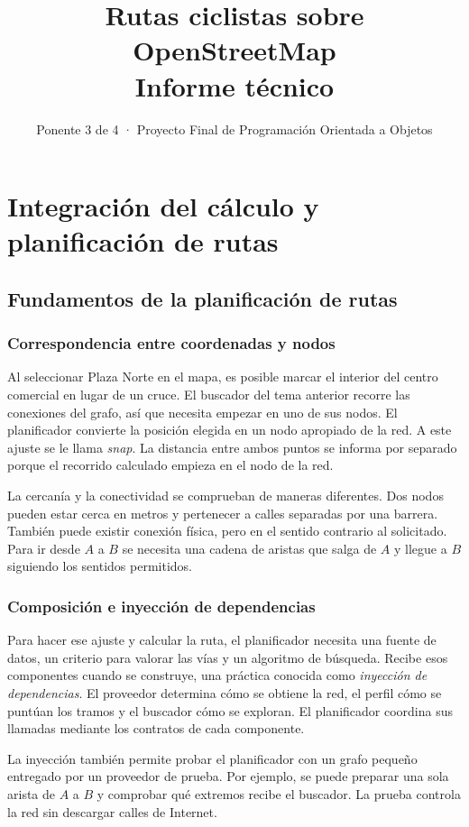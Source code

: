 \documentclass[11pt,a4paper]{article}
\title{Rutas ciclistas sobre OpenStreetMap\\Informe técnico}
\author{Ponente 3 de 4 · Proyecto Final de Programación Orientada a Objetos}
\date{}
\begin{document}
\maketitle
\setcounter{section}{2}
\section{Integración del cálculo y planificación de rutas}

\subsection{Fundamentos de la planificación de rutas}

\subsubsection{Correspondencia entre coordenadas y nodos}
Al seleccionar Plaza Norte en el mapa, es posible marcar el interior del centro comercial en lugar de un cruce. El buscador del tema anterior recorre las conexiones del grafo, así que necesita empezar en uno de sus nodos. El planificador convierte la posición elegida en un nodo apropiado de la red. A este ajuste se le llama \emph{snap}. La distancia entre ambos puntos se informa por separado porque el recorrido calculado empieza en el nodo de la red.

La cercanía y la conectividad se comprueban de maneras diferentes. Dos nodos pueden estar cerca en metros y pertenecer a calles separadas por una barrera. También puede existir conexión física, pero en el sentido contrario al solicitado. Para ir desde \(A\) a \(B\) se necesita una cadena de aristas que salga de \(A\) y llegue a \(B\) siguiendo los sentidos permitidos.

\subsubsection{Composición e inyección de dependencias}
Para hacer ese ajuste y calcular la ruta, el planificador necesita una fuente de datos, un criterio para valorar las vías y un algoritmo de búsqueda. Recibe esos componentes cuando se construye, una práctica conocida como \emph{inyección de dependencias}. El proveedor determina cómo se obtiene la red, el perfil cómo se puntúan los tramos y el buscador cómo se exploran. El planificador coordina sus llamadas mediante los contratos de cada componente.

La inyección también permite probar el planificador con un grafo pequeño entregado por un proveedor de prueba. Por ejemplo, se puede preparar una sola arista de \(A\) a \(B\) y comprobar qué extremos recibe el buscador. La prueba controla la red sin descargar calles de Internet.
\end{document}
